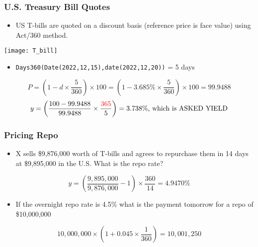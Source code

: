 \documentclass[10pt]{beamer}
\begin{document}
	
	
	
	\begin{frame}
		\frametitle{U.S. Treasury Bill Quotes}
		
		\begin{itemize}
			\item US T-bills are quoted on a discount basis (reference price is face value) using Act/360 method.
		\end{itemize}
		\begin{center}
			\texttt{[image: T\_bill]}
		\end{center}
		\begin{itemize}
			\item \texttt{Days360(Date(2022,12,15),date(2022,12,20))} = 5 days
		\end{itemize} \vspace{10pt}
		$$
		P = \left( 1 - d \times \frac{5}{360} \right) \times 100 = \left( 1- 3.685\% \times \frac{5}{360} \right) \times 100 = 99.9488
		$$
		$$
		y = \left( \frac{100-99.9488}{99.9488} \times \frac{\color{red}365}{5} \right) = 3.738\% \text{, which is ASKED YIELD}
		$$	
	\end{frame}
	
	
	
	
	\begin{frame}
		\frametitle{Pricing Repo}
		
		\begin{itemize}
			\item X sells \$9,876,000 worth of T-bills and agrees to repurchase them in 14 days at \$9,895,000 in the U.S. What is the repo rate?
		\end{itemize}	\vspace{10pt}
		$$
		y = \left( \frac{9,895,000}{9,876,000} -1 \right) \times \frac{360}{14} = 4.9470\%
		$$
		\begin{itemize}
			\item If the overnight repo rate is 4.5\% what is the payment tomorrow for a repo of \$10,000,000
		\end{itemize} \vspace{10pt}
		$$
		10,000,000 \times \left( 1+0.045 \times \frac{1}{360} \right) = 10,001,250
		$$
		
	\end{frame}
	
	
	
	
	
	
\end{document}
